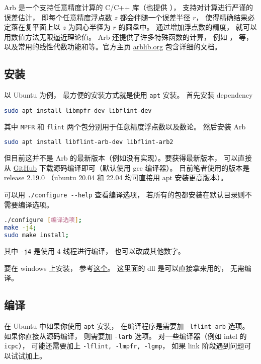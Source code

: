

Arb 是一个支持任意精度计算的 C/C++ 库（也提供 ）， 支持对计算进行严谨的误差估计， 即每个任意精度浮点数 $z$ 都会伴随一个误差半径 $r$， 使得精确结果必定落在复平面上以 $z$ 为圆心半径为 $r$ 的圆盘中。 通过增加浮点数的精度， 就可以用数值方法无限逼近理论值。 Arb 还提供了许多特殊函数的计算， 例如 ，  等，以及常用的线性代数功能和等。官方主页 \href{https://arblib.org/}{arblib.org} 包含详细的文档。

\subsection{安装}
以 Ubuntu 为例， 最方便的安装方式就是使用 \verb|apt| 安装。 首先安装 dependency
\begin{lstlisting}[language=bash]
sudo apt install libmpfr-dev libflint-dev
\end{lstlisting}
其中 \verb|MPFR| 和 \verb|flint| 两个包分别用于任意精度浮点数以及数论。 然后安装 Arb
\begin{lstlisting}[language=bash]
sudo apt install libflint-arb-dev libflint-arb2
\end{lstlisting}

但目前这并不是 Arb 的最新版本（例如没有实现）。要获得最新版本， 可以直接从 \href{https://github.com/fredrik-johansson/arb/}{GitHub} 下载源码编译即可（默认使用 gcc 编译器）。 目前笔者使用的版本是 release 2.19.0 （ubuntu 20.04 和 22.04 均可直接用 apt 安装更高版本）。

可以用 \verb|./configure --help| 查看编译选项， 若所有的包都安装在默认目录则不需要编译选项。
\begin{lstlisting}[language=bash]
./configure [编译选项];
make -j4;
sudo make install;
\end{lstlisting}
其中 \verb|-j4| 是使用 4 线程进行编译， 也可以改成其他数字。

要在 windows 上安装， 参考\href{https://github.com/ahrvoje/arb4win}{这个}。 这里面的 dll 是可以直接拿来用的， 无需编译。

\subsection{编译}
在 Ubuntu 中如果你使用 \verb|apt| 安装， 在编译程序是需要加 \verb|-lflint-arb| 选项。 如果你直接从源码编译， 则需要加 \verb|-larb| 选项。 对一些编译器（例如 intel 的 \verb|icpc|）， 可能还需要加上 \verb|-lflint, -lmpfr, -lgmp|， 如果 link 阶段遇到问题可以试试加上。

